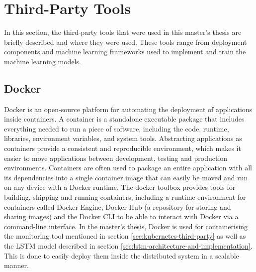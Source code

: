   \section{Third-Party Tools}
  \label{sec:third-party-tools-architecture}

    In this section, the third-party tools that were used in this master's thesis are briefly described and where they were used.
    These tools range from deployment components and machine learning frameworks used to implement and train the machine learning models.

  \subsection{Docker}
  \label{sec:docker-third-party}

    Docker \cite{dockerDockerDocumentationOverview2023} is an open-source platform for automating the deployment of applications inside containers. A container is a standalone executable package that includes everything needed to run a piece of software, including the code, runtime, libraries, environment variables, and system tools.
    Abstracting applications as containers provide a consistent and reproducible environment, which makes it easier to move applications between development, testing and production environments.
    Containers are often used to package an entire application with all its dependencies into a single container image that can easily be moved and run on any device with a Docker runtime.
    The docker toolbox provides tools for building, shipping and running containers, including a runtime environment for containers called Docker Engine, Docker Hub (a repository for storing and sharing images) and the Docker CLI to be able to interact with Docker via a command-line interface.
    In the master's thesis, Docker is used for containerising the monitoring tool mentioned in section \ref{sec:kubernetes-third-party} as well as the LSTM model described in section \ref{sec:lstm-architecture-and-implementation}.
    This is done to easily deploy them inside the distributed system in a scalable manner. 

